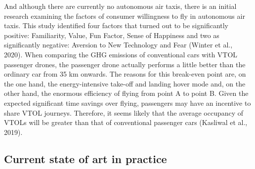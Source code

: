 \documentclass[
]{book}
\begin{document}
And although there are currently no autonomous air taxis, there is an initial research examining the factors of consumer willingness to fly in autonomous air taxis. This study identified four factors that turned out to be significantly positive: Familiarity, Value, Fun Factor, Sense of Happiness and two as significantly negative: Aversion to New Technology and Fear (Winter et al., 2020).
When comparing the GHG emissions of conventional cars with VTOL passenger drones, the passenger drone actually performs a little better than the ordinary car from 35 km onwards. The reasons for this break-even point are, on the one hand, the energy-intensive take-off and landing hover mode and, on the other hand, the enormous efficiency of flying from point A to point B. Given the expected significant time savings over flying, passengers may have an incentive to share VTOL journeys. Therefore, it seems likely that the average occupancy of VTOLs will be greater than that of conventional passenger cars (Kasliwal et al., 2019).

\hypertarget{current-state-of-art-in-practice-8}{%
\subsection*{Current state of art in practice}\label{current-state-of-art-in-practice-8}}
\end{document}
